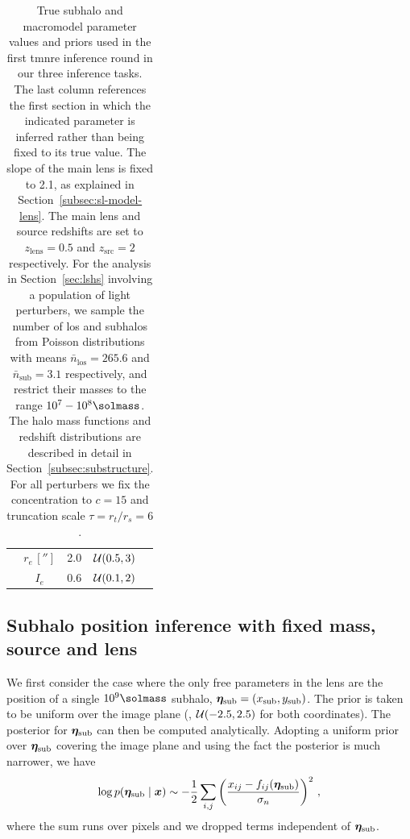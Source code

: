\begin{table}
\begin{tabular}{c c c c c}
        & $r_e\, ['']$ & 2.0 & $\mathcal{U}(0.5, 3)$ \\
        & $I_e$ & 0.6 & $\mathcal{U}(0.1, 2)$ \\
        \bottomrule
    \end{tabular}
    \caption{True subhalo and macromodel parameter values and priors used in the first \gls*{tmnre} inference round in our three inference tasks. The last column references the first section in which the indicated parameter is inferred rather than being fixed to its true value. The slope of the main lens is fixed to \num{2.1}, as explained in Section~\ref{subsec:sl-model-lens}. The main lens and source redshifts are set to $z_\mathrm{lens} = 0.5$ and $z_\mathrm{src} = 2$ respectively. For the analysis in Section~\ref{sec:lshs} involving a population of light perturbers, we sample the number of \gls*{los} and subhalos from Poisson distributions with means $\bar{n}_\mathrm{los} = 265.6$ and $\bar{n}_\mathrm{sub} = 3.1$ respectively, and restrict their masses to the range $10^7-10^8\si{\solmass}$. The halo mass functions and redshift distributions are described in detail in Section~\ref{subsec:substructure}. For all perturbers we fix the concentration to $c = 15$ and truncation scale $\tau = r_t / r_s = 6$.}
    \label{tab:params-and-priors}
\end{table}

\subsection{Subhalo position inference with fixed mass, source and lens}\label{subsec:sp}

We first consider the case where the only free parameters in the lens are the position of a single $10^9\si{\solmass}$ subhalo, ${{\bm{\eta}}}_\mathrm{sub} = (x_\mathrm{sub}, y_\mathrm{sub})$. The prior is taken to be uniform over the image plane (\ie, $\mathcal{U}(-2.5, 2.5)$ for both coordinates). The posterior for ${{\bm{\eta}}}_\mathrm{sub}$ can then be computed analytically. Adopting a uniform prior over ${{\bm{\eta}}}_\mathrm{sub}$ covering the image plane and using the fact the posterior is much narrower, we have
\begin{equation}
    \log p(\psubb \mid \data) %
    \sim -\frac{1}{2} \sum_{i,j} \left( \frac{x_{ij} - f_{ij}(\psubb)}{\sigma_n} \right)^2 \, ,
\end{equation}
where the sum runs over pixels and we dropped terms independent of ${{\bm{\eta}}}_\mathrm{sub}$.


